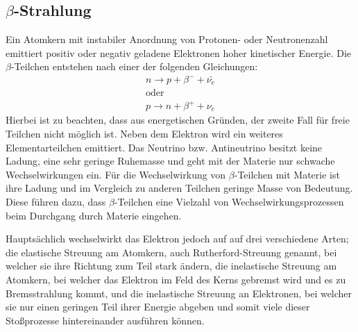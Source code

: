 \subsection{\texorpdfstring{$\beta$}{Beta}-Strahlung}
Ein Atomkern mit instabiler Anordnung von Protonen- oder Neutronenzahl emittiert positiv oder negativ geladene Elektronen hoher kinetischer Energie.
Die $\beta$-Teilchen entstehen nach einer der folgenden Gleichungen:
\begin{eqnarray}
n \rightarrow p + \beta^- + \bar{\nu_e} \\
\nonumber
\text{oder}\\
p \rightarrow n + \beta^+ + \nu_e
\end{eqnarray}
Hierbei ist zu beachten, dass aus energetischen Gründen, der zweite Fall für freie Teilchen nicht möglich ist.
Neben dem Elektron wird ein weiteres Elementarteilchen emittiert.
Das Neutrino bzw. Antineutrino besitzt keine Ladung, eine sehr geringe Ruhemasse und geht mit der Materie nur schwache Wechselwirkungen ein.
Für die Wechselwirkung von $\beta$-Teilchen mit Materie ist ihre Ladung und im Vergleich zu anderen Teilchen geringe Masse von Bedeutung.
Diese führen dazu, dass $\beta$-Teilchen eine Vielzahl von Wechselwirkungsprozessen beim Durchgang durch Materie eingehen.


Hauptsächlich wechselwirkt das Elektron jedoch auf auf drei verschiedene Arten; die elastische Streuung am Atomkern, auch Rutherford-Streuung genannt,
bei welcher sie ihre Richtung zum Teil stark ändern, die inelastische Streuung am Atomkern, bei welcher das Elektron im Feld 
des Kerns gebremst wird und es zu Bremsstrahlung kommt, und die inelastische Streuung an Elektronen, bei welcher sie nur einen geringen Teil 
ihrer Energie abgeben und somit viele dieser Stoßprozesse hintereinander ausführen können.


